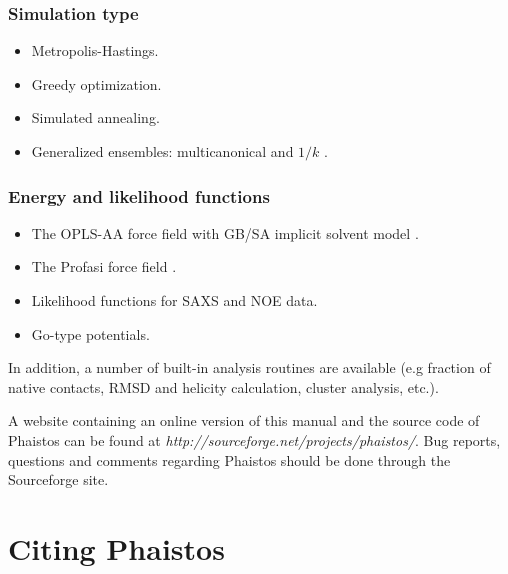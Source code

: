 \documentclass[11pt,a4paper,twoside]{book}
\begin{document}
\subsubsection*{Simulation type}
\begin{itemize}
\item Metropolis-Hastings.
\item Greedy optimization.
\item Simulated annealing.
\item Generalized ensembles: multicanonical and $1/k$ \cite{frellsen12}.
\end{itemize}
\subsubsection*{Energy and likelihood functions}
\begin{itemize}
\item The OPLS-AA force field \cite{jorgensen1996development} with GB/SA implicit solvent model \cite{qiu1997gbsa}.
\item The Profasi force field \cite{irback2006profasi}.
\item Likelihood functions for SAXS \cite{stovgaard2010calculation, stovgaard2011} and NOE \cite{olsson2011generative} data.
\item Go-type potentials. 
\end{itemize}

\noindent In addition, a number of built-in analysis routines are
available (e.g fraction of native contacts, RMSD and helicity
calculation, cluster analysis, etc.).

A website containing an online version of this manual and the source
code of Phaistos can be found at
\emph{http://sourceforge.net/projects/phaistos/}. Bug reports,
questions and comments regarding Phaistos should be done through the
Sourceforge site.

%

\section{Citing Phaistos}
\label{sec:citing}
\end{document}
